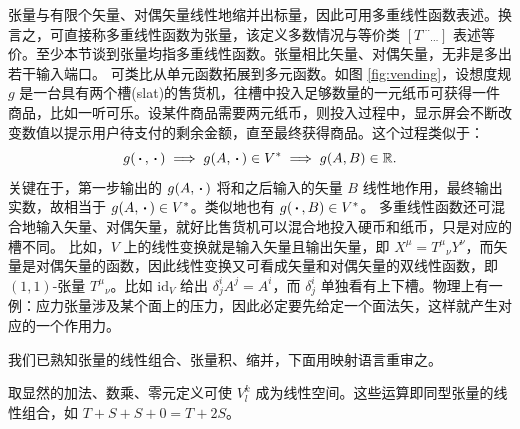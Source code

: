 张量与有限个矢量、对偶矢量线性地缩并出标量，因此可用多重线性函数表述。换言之，可直接称多重线性函数为张量，该定义多数情况与等价类 $[T^{\cdots}{}_{\cdots}]$ 表述等价。至少本节谈到张量均指多重线性函数。张量相比矢量、对偶矢量，无非是多出若干输入端口。
可类比从单元函数拓展到多元函数。如图 \ref{fig:vending}，设想度规 $g$ 是一台具有两个槽(slat)的售货机，往槽中投入足够数量的一元纸币可获得一件商品，比如一听可乐。设某件商品需要两元纸币，则投入过程中，显示屏会不断改变数值以提示用户待支付的剩余金额，直至最终获得商品。这个过程类似于：
\[
    g(\oo,\oo)\To g(A,\oo)\in V^*\To g(A,B)\in\R.  
\]
关键在于，第一步输出的 $g(A,\oo)$ 将和之后输入的矢量 $B$ 线性地作用，最终输出实数，故相当于 $g(A,\oo)\in V^*$。类似地也有 $g(\oo,B)\in V^*$。
多重线性函数还可混合地输入矢量、对偶矢量，就好比售货机可以混合地投入硬币和纸币，只是对应的槽不同。
比如，$V$ 上的线性变换就是输入矢量且输出矢量，即 $X^\mu=T^\mu{}_\nu Y^\nu$，而矢量是对偶矢量的函数，因此线性变换又可看成矢量和对偶矢量的双线性函数，即 $(1,1)$-张量 $T^\mu{}_\nu$。比如 $\mathrm{id}_V$ 给出 $\delta^i_j A^j=A^i$，而 $\delta^i_j$ 单独看有上下槽。物理上有一例：应力张量涉及某个面上的压力，因此必定要先给定一个面法矢，这样就产生对应的一个作用力。

我们已熟知张量的线性组合、张量积、缩并，下面用映射语言重审之。

\begin{definition}  
取显然的加法、数乘、零元定义可使 $V^k_l$ 成为线性空间。这些运算即同型张量的线性组合，如 $T+ S+S+0=T+2S$。
\end{definition}

